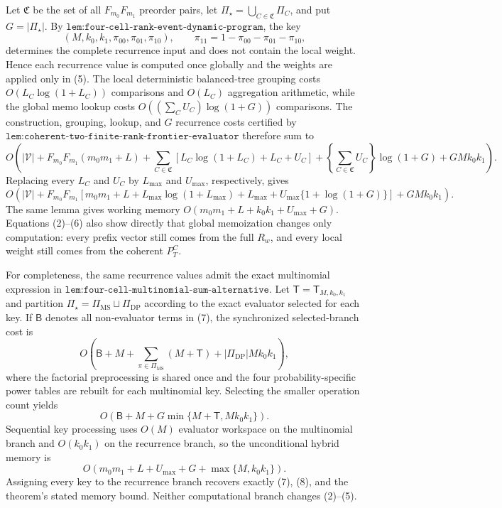 Let \(\mathfrak C\) be the set of all \(F_{m_0}F_{m_1}\) preorder pairs, let \(\Pi_\star=\bigcup_{C\in\mathfrak C}\Pi_C\), and put \(G=|\Pi_\star|\). By \(\texttt{lem:four-cell-rank-event-dynamic-program}\), the key
\[
(M,k_0,k_1,\pi_{00},\pi_{01},\pi_{10}),\qquad
\pi_{11}=1-\pi_{00}-\pi_{01}-\pi_{10}, \tag{6}
\]
determines the complete recurrence input and does not contain the local weight. Hence each recurrence value is computed once globally and the weights are applied only in (5). The local deterministic balanced-tree grouping costs \(O(L_C\log(1+L_C))\) comparisons and \(O(L_C)\) aggregation arithmetic, while the global memo lookup costs \(O((\sum_CU_C)\log(1+G))\) comparisons. The construction, grouping, lookup, and \(G\) recurrence costs certified by \(\texttt{lem:coherent-two-finite-rank-frontier-evaluator}\) therefore sum to
\[
O\!\left(
|\mathcal V|+F_{m_0}F_{m_1}(m_0m_1+L)+\sum_{C\in\mathfrak C}\left[L_C\log(1+L_C)+L_C+U_C\right]+\left\{\sum_{C\in\mathfrak C}U_C\right\}\log(1+G)+GMk_0k_1
\right). \tag{7}
\]
Replacing every \(L_C\) and \(U_C\) by \(L_{\max}\) and \(U_{\max}\), respectively, gives
\[
O\!\left(|\mathcal V|+F_{m_0}F_{m_1}\left[m_0m_1+L+L_{\max}\log(1+L_{\max})+L_{\max}+U_{\max}\{1+\log(1+G)\}\right]+GMk_0k_1\right). \tag{8}
\]
The same lemma gives working memory \(O(m_0m_1+L+k_0k_1+U_{\max}+G)\). Equations (2)--(6) also show directly that global memoization changes only computation: every prefix vector still comes from the full \(R_w\), and every local weight still comes from the coherent \(P_T^C\).

For completeness, the same recurrence values admit the exact multinomial expression in \(\texttt{lem:four-cell-multinomial-sum-alternative}\). Let \(\mathsf T=\mathsf T_{M,k_0,k_1}\) and partition \(\Pi_\star=\Pi_{\mathrm{MS}}\sqcup\Pi_{\mathrm{DP}}\) according to the exact evaluator selected for each key. If \(\mathsf B\) denotes all non-evaluator terms in (7), the synchronized selected-branch cost is
\[
O\!\left(\mathsf B+M+\sum_{\pi\in\Pi_{\mathrm{MS}}}(M+\mathsf T)+|\Pi_{\mathrm{DP}}|Mk_0k_1\right), \tag{9}
\]
where the factorial preprocessing is shared once and the four probability-specific power tables are rebuilt for each multinomial key. Selecting the smaller operation count yields
\[
O\!\left(\mathsf B+M+G\min\{M+\mathsf T,Mk_0k_1\}\right). \tag{10}
\]
Sequential key processing uses \(O(M)\) evaluator workspace on the multinomial branch and \(O(k_0k_1)\) on the recurrence branch, so the unconditional hybrid memory is
\[
O\!\left(m_0m_1+L+U_{\max}+G+\max\{M,k_0k_1\}\right). \tag{11}
\]
Assigning every key to the recurrence branch recovers exactly (7), (8), and the theorem's stated memory bound. Neither computational branch changes (2)--(5).

